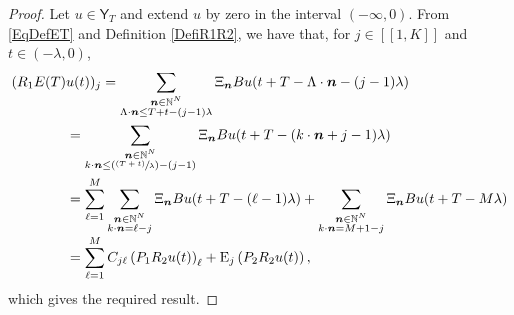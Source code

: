 \documentclass[10pt]{article}
\newcommand{\Psfrac}[2]{(\sfrac{#1}{#2})}
\newcommand{\bn}{\boldsymbol{n}}
\newcommand{\llbracket}{[\![}
\newcommand{\rrbracket}{]\!]}
\theoremstyle{plain}
\theoremstyle{definition}
\newcommand{\Epsilon}{\mathrm E}
\numberwithin{equation}{section}\numberwithin{figure}{section}\emergencystretch=3em
\begin{document}
\begin{proof}
Let $u \in \mathsf Y_T$ and extend $u$ by zero in the interval $(-\infty, 0)$. From \eqref{EqDefET} and Definition \ref{DefiR1R2}, we have that, for $j \in \llbracket 1, K\rrbracket$ and $t \in (-\lambda, 0)$,
\begin{align*}
(R_1 E(T) &u(t))_{j} = \sum_{\substack{\bn \in \mathbb N^N \\ \Lambda \cdot \bn \leq T + t - (j - 1)\lambda}} \Xi_{\bn} B u(t + T - \Lambda \cdot \bn - (j - 1)\lambda)  \\
& = \sum_{\substack{\bn \in \mathbb N^N \\ k \cdot \bn \leq \Psfrac{(T + t)}{\lambda} - (j - 1)}} \Xi_{\bn} B u(t + T - (k \cdot \bn + j - 1)\lambda)  \\
& = \sum_{\ell=1}^M \sum_{\substack{\bn \in \mathbb N^N \\ k \cdot \bn = \ell - j}} \Xi_{\bn} B u(t + T - (\ell - 1)\lambda) + \sum_{\substack{\bn \in \mathbb N^N \\ k \cdot \bn = M+1 - j}} \Xi_{\bn} B u(t + T - M \lambda)  \\[-3pt]
& = \sum_{\ell=1}^M C_{j\ell} \left(P_1 R_2 u(t)\right)_{\ell} + \Epsilon_j \left(P_2 R_2 u(t)\right),
\end{align*}
which gives the required result.
\end{proof}
\end{document}
